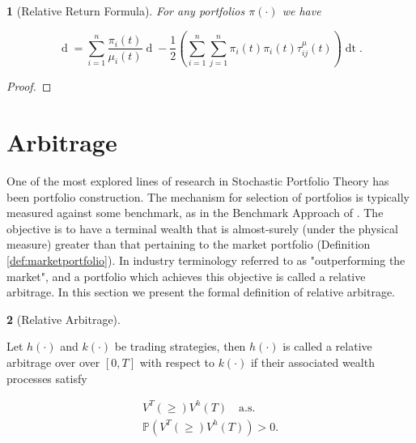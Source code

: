 \documentclass[british]{amsart}
\numberwithin{equation}{section}
\numberwithin{figure}{section}
\theoremstyle{plain}
\newtheorem{thm}{\protect\theoremname}[section]
\theoremstyle{definition}
\newtheorem{defn}[thm]{\protect\definitionname}
\theoremstyle{plain}
\theoremstyle{plain}
\theoremstyle{plain}
\theoremstyle{remark}
\theoremstyle{plain}
\providecommand{\definitionname}{Definition}
\providecommand{\theoremname}{Theorem}
\renewcommand{\d}[1]{\mathop{\mathrm{d}{#1}}}
\newcommand{\almostsurely}{\text{a.s.}}
\newcommand{\measure}{\mathbb{P}}
\newcommand{\valueprocess}[2]{V^{#1}(#2)}
\begin{document}
\begin{thm} [Relative Return Formula]
	For any portfolios $\pi(\cdot)$ we have

	\begin{equation*}
			\d{ \log{ \left( \frac{ V^{\pi}(t) }{ V^{\mu}(t) } \right) } } =
				\sum_{i=1}^{n} \frac{\pi_{i}(t)}{\mu_{i}(t)} \d{\mu_{i}(t)} -
				\frac{1}{2} 
				\left( 
					\sum_{i=1}^{n} \sum_{j=1}^{n} \pi_{i}(t) \pi_{i}(t) \tau_{ij}^{\mu}(t)
				\right)
				\d{t}.
	\end{equation*}
\end{thm}

\begin{proof}
\end{proof}

\newpage

\section{Arbitrage}

One of the most explored lines of research in Stochastic Portfolio Theory has been portfolio construction. The mechanism for selection of portfolios is typically measured against some benchmark, as in the Benchmark Approach of \cite{platen2006}. The objective is to have a terminal wealth that is almost-surely (under the physical measure) greater than that pertaining to the market portfolio (Definition \ref{def:marketportfolio}). In industry terminology referred to as "outperforming the market", and a portfolio which achieves this objective is called a relative arbitrage. In this section we present the formal definition of relative arbitrage.



\begin{defn} [Relative Arbitrage]
	\label{def:relativearbitrage}

	Let $h(\cdot)$ and $k(\cdot)$ be trading strategies, then $h(\cdot)$ is called a relative arbitrage over over $[0,T]$ with respect to $k(\cdot)$ if their associated wealth processes satisfy

	\begin{gather*}
		\valueprocess{T} \ge \valueprocess{h}{T} \quad \almostsurely \\
		\measure(\valueprocess{T} \ge \valueprocess{h}{T}) > 0.
	\end{gather*}

\end{defn}
\end{document}
